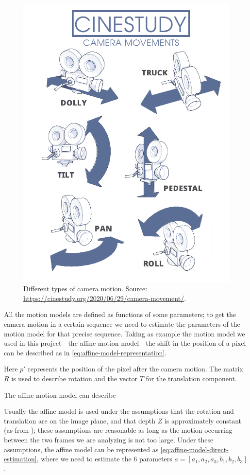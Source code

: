 \begin{figure}
    \centering
    \includegraphics[width=.7\linewidth]{../assets/images/camera-movement.png}
    \caption{Different types of camera motion. Source: \url{https://cinestudy.org/2020/06/29/camera-movement/}.}
    \label{fig:camera-motion}
\end{figure}

All the motion models are defined as functions of some parameters; to get the camera motion in a certain sequence we need to estimate the parameters of the motion model for that precise sequence. Taking as example the motion model we used in this project - the affine motion model - the shift in the position of a pixel can be described as in \cref{eq:affine-model-representation}.



Here $p'$ represents the position of the pixel after the camera motion. The matrix $R$ is used to describe rotation and the vector $T$ for the translation component.

The affine motion model can describe

Usually the affine model is used under the assumptions that the rotation and translation are on the image plane, and that depth $Z$ is approximately constant (as from \cite{WangBook}); these assumptions are reasonable as long as the motion occurring between the two frames we are analyzing is not too large.
Under these assumptions, the affine model can be represented as \cref{eq:affine-model-direct-estimation}, where we need to estimate the 6 parameters $a =[a_1, a_2, a_3, b_1, b_2, b_3 ]$.

